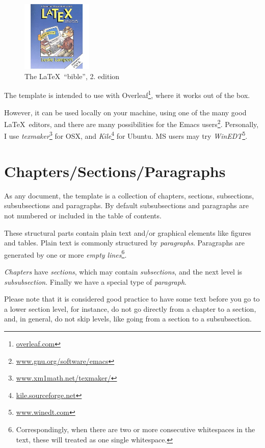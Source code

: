 \begin{figure}[!htbp]
\centering 
    \includegraphics[width=0.3\textwidth]{Graphics/lamport}
    \caption{The \LaTeX\ ``bible'', 2. edition \label{fig:lamport}}
\end{figure}


The template is intended to use with Overleaf\footnote{\url{overleaf.com}}, where it works out of the box.

However, it can be used locally on your machine, using one of the many good \LaTeX\ editors, and there are many possibilities for the Emacs users\footnote{\url{www.gnu.org/software/emacs}}. Personally, I use {\em texmaker}\footnote{\url{www.xm1math.net/texmaker/}}
for OSX, and 
{\em Kile}\footnote{\url{kile.sourceforge.net}}
for Ubuntu. MS users may try {\em WinEDT}\footnote{\url{www.winedt.com}}.


\section{Chapters/Sections/Paragraphs}

As any document, the template is a collection of chapters, sections, subsections, subsubsections and paragraphs. By default subsubsections and paragraphs are not numbered or included in the table of contents. 

These structural parts contain
plain text and/or graphical elements like figures and tables. 
Plain text is commonly structured by {\em paragraphs}. Paragraphs are generated by one or more {\em empty lines}\footnote{Correspondingly, when there are two or more       consecutive          whitespaces in the text, these will treated as one single whitespace.}. 

{\em Chapters} have {\em sections}, which may contain {\em subsections}, and the next level is {\em subsubsection}.
Finally we have a special type of {\em paragraph}.

Please note that it is considered good practice to have some text before you go to a lower section level, for instance, do not go directly from a chapter to a section, and, in general, do not skip levels, like going from a section to a subsubsection.

